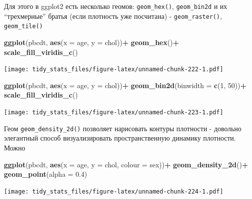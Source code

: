 \documentclass[]{book}
\newenvironment{Shaded}{\begin{snugshade}}{\end{snugshade}}
\newcommand{\KeywordTok}[1]{\textcolor[rgb]{0.13,0.29,0.53}{\textbf{#1}}}
\newcommand{\DataTypeTok}[1]{\textcolor[rgb]{0.13,0.29,0.53}{#1}}
\newcommand{\DecValTok}[1]{\textcolor[rgb]{0.00,0.00,0.81}{#1}}
\newcommand{\FloatTok}[1]{\textcolor[rgb]{0.00,0.00,0.81}{#1}}
\newcommand{\StringTok}[1]{\textcolor[rgb]{0.31,0.60,0.02}{#1}}
\newcommand{\OperatorTok}[1]{\textcolor[rgb]{0.81,0.36,0.00}{\textbf{#1}}}
\newcommand{\NormalTok}[1]{#1}
\begin{document}
Для этого в ggplot2 есть несколько геомов: \texttt{geom\_hex()},
\texttt{geom\_bin2d} и их ``трехмерные'' братья (если плотность уже
посчитана) - \texttt{geom\_raster()}, \texttt{geom\_tile()}

\begin{Shaded}
\begin{Highlighting}[]
\KeywordTok{ggplot}\NormalTok{(pbcdt, }\KeywordTok{aes}\NormalTok{(}\DataTypeTok{x =}\NormalTok{ age, }\DataTypeTok{y =}\NormalTok{ chol))}\OperatorTok{+}
\StringTok{  }\KeywordTok{geom_hex}\NormalTok{()}\OperatorTok{+}
\StringTok{  }\KeywordTok{scale_fill_viridis_c}\NormalTok{()}
\end{Highlighting}
\end{Shaded}

\texttt{[image: tidy\_stats\_files/figure-latex/unnamed-chunk-222-1.pdf]}

\begin{Shaded}
\begin{Highlighting}[]
\KeywordTok{ggplot}\NormalTok{(pbcdt, }\KeywordTok{aes}\NormalTok{(}\DataTypeTok{x =}\NormalTok{ age, }\DataTypeTok{y =}\NormalTok{ chol))}\OperatorTok{+}
\StringTok{  }\KeywordTok{geom_bin2d}\NormalTok{(}\DataTypeTok{binwidth =} \KeywordTok{c}\NormalTok{(}\DecValTok{1}\NormalTok{, }\DecValTok{50}\NormalTok{))}\OperatorTok{+}
\StringTok{  }\KeywordTok{scale_fill_viridis_c}\NormalTok{()}
\end{Highlighting}
\end{Shaded}

\texttt{[image: tidy\_stats\_files/figure-latex/unnamed-chunk-223-1.pdf]}

Геом \texttt{geom\_density\_2d()} позволяет нарисовать контуры плотности
- довольно элегантный способ визуализировать пространственную динамику
плотности. Можно

\begin{Shaded}
\begin{Highlighting}[]
\KeywordTok{ggplot}\NormalTok{(pbcdt, }\KeywordTok{aes}\NormalTok{(}\DataTypeTok{x =}\NormalTok{ age, }\DataTypeTok{y =}\NormalTok{ chol, }\DataTypeTok{colour =}\NormalTok{ sex))}\OperatorTok{+}
\StringTok{  }\KeywordTok{geom_density_2d}\NormalTok{()}\OperatorTok{+}
\StringTok{  }\KeywordTok{geom_point}\NormalTok{(}\DataTypeTok{alpha =} \FloatTok{0.4}\NormalTok{)}
\end{Highlighting}
\end{Shaded}

\texttt{[image: tidy\_stats\_files/figure-latex/unnamed-chunk-224-1.pdf]}
\end{document}
